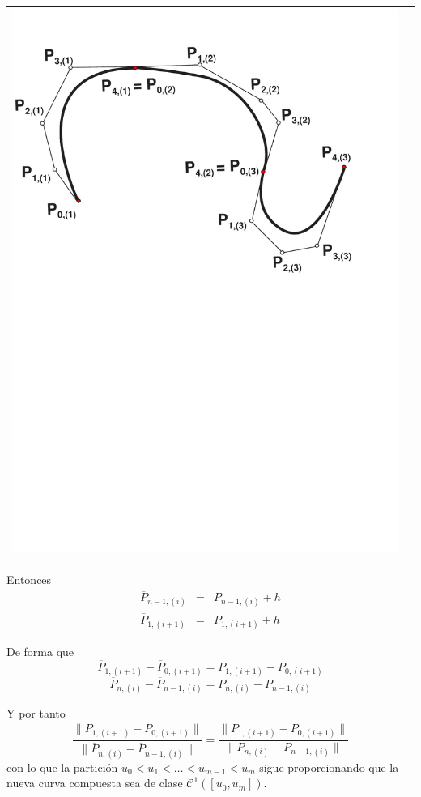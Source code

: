 \documentclass[ebook,oneside]{memoir}
\begin{document}
\begin{center}
\begin{tabular}{cc}
\includegraphics[scale=0.45]{3_21b.pdf}
\end{tabular}
\end{center}


Entonces $$\begin{array}{rcl} \overline{P}_{n-1, (i)}&=&P_{n-1, (i)}+h\\ \overline{P}_{1, (i+1)}&=&P_{1, (i+1)}+h \end{array}$$

De forma que
$$\overline{P}_{1, (i+1)}-\overline{P}_{0, (i+1)}=P_{1, (i+1)}-P_{0, (i+1)}$$
$$\overline{P}_{n, (i)}-\overline{P}_{n-1, (i)}=P_{n, (i)}-P_{n-1, (i)}$$

Y por tanto
$$\frac{\parallel \overline{P}_{1,(i+1)}-\overline{P}_{0,(i+1)}\parallel}{\parallel \overline{P}_{n, (i)}-\overline{P}_{n-1,(i)} \parallel}=\frac{\parallel P_{1,(i+1)}-P_{0,(i+1)}\parallel}{\parallel P_{n, (i)}-P_{n-1,(i)} \parallel}$$
con lo que la partici\'{o}n $u_0<u_1<\ldots<u_{m-1}<u_m$ sigue proporcionando que la nueva curva compuesta sea de clase ${\mathcal  C}^1([u_0,u_m])$.
\end{document}
